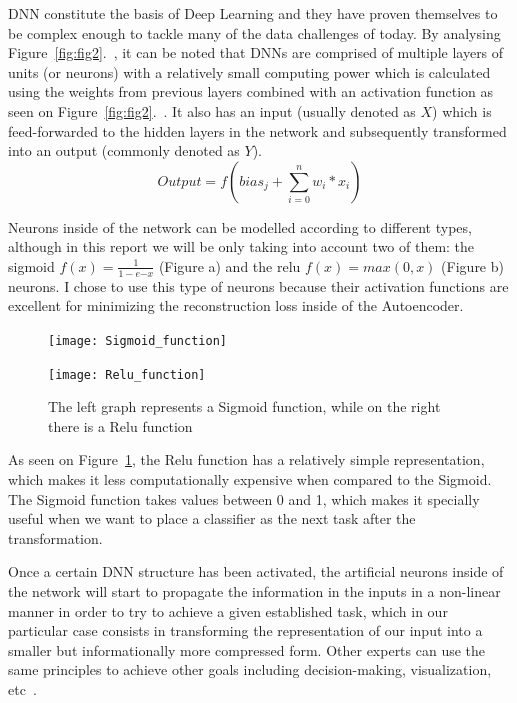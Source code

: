 DNN constitute the basis of Deep Learning and they have proven themselves to be complex enough to tackle many of the data challenges of today. By analysing Figure~\ref{fig:fig2}.~, it can be noted that DNNs are comprised of multiple layers of units (or neurons) with a relatively small computing power which is calculated using the weights from previous layers combined with an activation function as seen on Figure~\ref{fig:fig2}.~. It also has an input (usually denoted as $X$) which is feed-forwarded to the hidden layers in the network and subsequently transformed into an output (commonly denoted as $Y$). 
%
\begin{equation}
\label{eq:artificial neuron}
Output = f( bias_j + \sum_{i = 0}^{n} w_{i}*x_i ) 
\end{equation}

Neurons inside of the network can be modelled  according to different types, although in this report we will be only taking into account two of them: the sigmoid $f(x) = \frac{1}{1 - e{-x}}$ (Figure a) and the relu $f(x) = max(0,x)$ (Figure b) neurons. I chose to use this type of neurons because their activation functions are excellent for minimizing the reconstruction loss inside of the Autoencoder. \newline
%
\begin{figure}[H]
	\begin{minipage}{.5\textwidth}
		\texttt{[image: Sigmoid\_function]}
	\end{minipage}%
	\begin{minipage}{.5\textwidth}
		\begin{flushright}
			\texttt{[image: Relu\_function]}  
		\end{flushright} 
	\end{minipage}  
	\caption{The left graph represents a Sigmoid function, while on the right there is a Relu function}
	\label{fig:fig3}
\end{figure}

As seen on Figure~\ref{fig:fig3}, the Relu function has a relatively simple representation, which makes it less computationally expensive when compared to the Sigmoid. The Sigmoid function takes values between 0 and 1, which makes it specially useful when we want to place a classifier as the next task after the transformation.\par 

Once a certain DNN structure has been activated, the artificial neurons inside of the network will start to propagate the information in the inputs in a non-linear manner in order to try to achieve a given established task, which in our particular case consists in transforming the representation of our input into a smaller but informationally more compressed form. Other experts can use the same principles to achieve other goals including decision-making, visualization, etc~\cite{Decision_making_DNN}.\par

